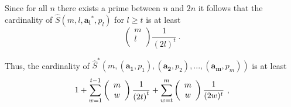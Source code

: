 \documentclass[10pt,conference]{IEEEtran}
\begin{document}
Since for all $n$ there exists a prime between $n$ and $2n$ it
follows that the cardinality of $\hat{S}(m,l,\mathbf{a_l}^*,p_l)$
for $l\geq t$ is at least \[ \left(
\begin{array}{c}
                             m \\
                             l \\
                           \end{array}
                           \right) \frac{1}{(2l)^t}~.\]

Thus, the cardinality of
$\hat{S}^*\left(m,(\mathbf{a_1},p_1),(\mathbf{a_2},p_2),...,(\mathbf{a_m},p_m)\right)$
is at least
\begin{equation}\label{up1}1+\sum_{w=1}^{t-1} \left(
\begin{array}{c}
                            m \\
                             w \\
                           \end{array}
                           \right) {\large \frac{1}{\left(2t\right)^t}} +\sum_{w=t}^m \left(
\begin{array}{c}
                            m \\
                             w \\
                           \end{array}
                           \right) \frac{1}{(2w)^t}~,
\end{equation}
\end{document}
